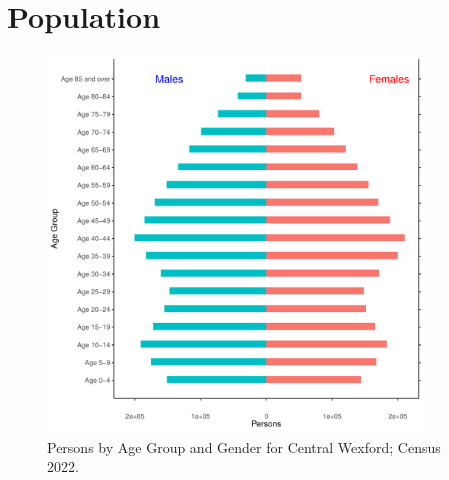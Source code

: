 \documentclass{article}
\begin{document}
\pagebreak

\section{Population} 
\label{sect:Pop}

\begin{figure}[h]
	\centering
	\includegraphics[width = 100mm]{../figures/PyramidPlot.pdf}
	\caption{Persons by Age Group and Gender for Central Wexford; Census 2022.}
	\label{fig:2ae19629-1a6a-13a3-e055-000000000001}
	\end{figure}
\end{document}
